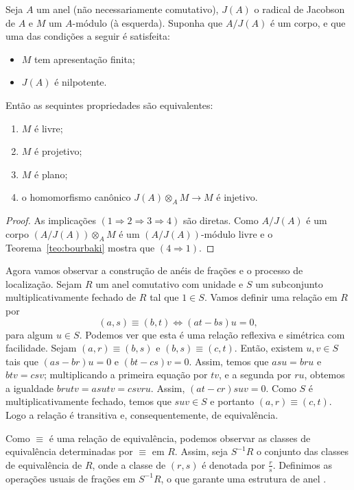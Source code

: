 \begin{corol} \cite[II, , p.84, Corollary 2]{bourbaki} \label{corol:bourbaki}
Seja $A$ um anel (não necessariamente comutativo), $J(A)$ o radical de Jacobson de $A$ e $M$ um $A$-módulo (à esquerda). Suponha que $A/J(A)$ é um corpo, e que uma das condições a seguir é satisfeita:
\begin{itemize}
	\item $M$ tem apresentação finita;
	\item $J(A)$ é nilpotente.
\end{itemize}
Então as sequintes propriedades são equivalentes:
\begin{enumerate}
	\item $M$ é livre;
	\item $M$ é projetivo;
	\item $M$ é plano;
	\item o homomorfismo canônico $J(A)\otimes_A M \rightarrow M$ é injetivo.
\end{enumerate}
\begin{proof}
As implicações $(1\Rightarrow 2 \Rightarrow 3 \Rightarrow 4)$ são diretas. Como $A/J(A)$ é um corpo $(A/J(A))\otimes_A M$ é um $(A/J(A))$-módulo livre e o Teorema~\ref{teo:bourbaki} mostra que $(4\Rightarrow 1)$.
\end{proof}
\end{corol}
Agora vamos observar a construção de anéis de frações e o processo de localização. Sejam $R$ um anel comutativo com unidade e $S$ um subconjunto multiplicativamente fechado de $R$ tal que $1 \in S$. Vamos definir uma relação em $R$ por \[(a,s) \equiv (b,t) \Leftrightarrow (at-bs)u = 0,\] para algum $u \in S$. Podemos ver que esta é uma relação reflexiva e simétrica com facilidade. Sejam $(a,r) \equiv (b,s)$ e $(b,s) \equiv (c,t)$. Então, existem $u, v \in S$ tais que $(as-br)u = 0$ e $(bt-cs)v = 0$. Assim, temos que $asu = bru$ e $btv = csv$; multiplicando a primeira equação por $tv$, e a segunda por $ru$, obtemos a igualdade $brutv = asutv = csvru$. Assim, $(at-cr)suv = 0$. Como $S$ é multiplicativamente fechado, temos que $suv \in S$ e portanto $(a,r)\equiv (c,t)$. Logo a relação é transitiva e, consequentemente, de equivalência. \par 
Como $\equiv$ é uma relação de equivalência, podemos observar as classes de equivalência determinadas por $\equiv$ em $R$. Assim, seja $S^{-1}R$ o conjunto das classes de equivalência de $R$, onde a classe de $(r,s)$ é denotada por $\frac{r}{s}$. Definimos as operações usuais de frações em $S^{-1}R$, o que garante uma estrutura de anel \cite[p.36]{atiyah}. \par
